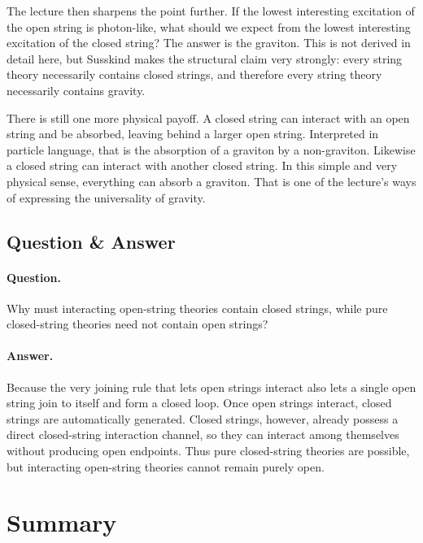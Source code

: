 The lecture then sharpens the point further. If the lowest interesting excitation of the open string is photon-like, what should we expect from the lowest interesting excitation of the closed string? The answer is the graviton. This is not derived in detail here, but Susskind makes the structural claim very strongly: every string theory necessarily contains closed strings, and therefore every string theory necessarily contains gravity.

There is still one more physical payoff. A closed string can interact with an open string and be absorbed, leaving behind a larger open string. Interpreted in particle language, that is the absorption of a graviton by a non-graviton. Likewise a closed string can interact with another closed string. In this simple and very physical sense, everything can absorb a graviton. That is one of the lecture's ways of expressing the universality of gravity.

\subsection{Question \& Answer}

\paragraph{Question.} Why must interacting open-string theories contain closed strings, while pure closed-string theories need not contain open strings?

\paragraph{Answer.} Because the very joining rule that lets open strings interact also lets a single open string join to itself and form a closed loop. Once open strings interact, closed strings are automatically generated. Closed strings, however, already possess a direct closed-string interaction channel, so they can interact among themselves without producing open endpoints. Thus pure closed-string theories are possible, but interacting open-string theories cannot remain purely open.

\section{Summary}

